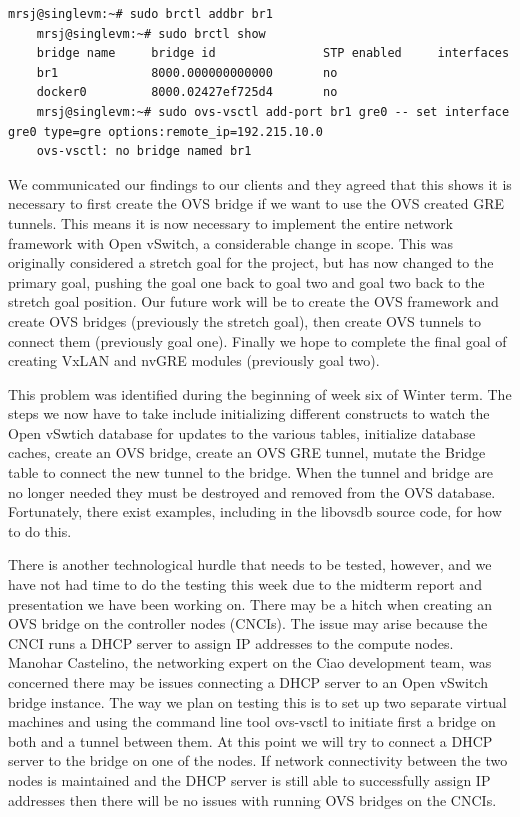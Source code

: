 \documentclass[10pt,onecolumn,journal,draftclsnofoot]{IEEEtran}
\begin{document}
\begin{lstlisting}[caption=No Linux Bridge and OVS Tunnel]
	mrsj@singlevm:~# sudo brctl addbr br1
	mrsj@singlevm:~# sudo brctl show
	bridge name     bridge id               STP enabled     interfaces
	br1             8000.000000000000       no
	docker0         8000.02427ef725d4       no
	mrsj@singlevm:~# sudo ovs-vsctl add-port br1 gre0 -- set interface gre0 type=gre options:remote_ip=192.215.10.0
	ovs-vsctl: no bridge named br1
\end{lstlisting}

We communicated our findings to our clients and they agreed that this shows it
is necessary to first create the OVS bridge if we want to use the OVS created
GRE tunnels. This means it is now necessary to implement the entire network
framework with Open vSwitch, a considerable change in scope. This was
originally considered a stretch goal for the project, but has now changed to
the primary goal, pushing the goal one back to goal two and goal two back to
the stretch goal position. Our future work will be to create the OVS framework
and create OVS bridges (previously the stretch goal), then create OVS tunnels
to connect them (previously goal one). Finally we hope to complete the final
goal of creating VxLAN and nvGRE modules (previously goal two).

This problem was identified during the beginning of week six of Winter term.
The steps we now have to take include initializing different constructs to
watch the Open vSwtich database for updates to the various tables, initialize
database caches, create an OVS bridge, create an OVS GRE tunnel, mutate the
Bridge table to connect the new tunnel to the bridge. When the tunnel and
bridge are no longer needed they must be destroyed and removed from the OVS
database. Fortunately, there exist examples, including in the libovsdb source
code, for how to do this.

There is another technological hurdle that needs to be tested, however, and we
have not had time to do the testing this week due to the midterm report and
presentation we have been working on. There may be a hitch when creating an OVS
bridge on the controller nodes (CNCIs). The issue may arise because the CNCI
runs a DHCP server to assign IP addresses to the compute nodes. Manohar
Castelino, the networking expert on the Ciao development team, was concerned
there may be issues connecting a DHCP server to an Open vSwitch bridge
instance. The way we plan on testing this is to set up two separate virtual
machines and using the command line tool ovs-vsctl to initiate first a bridge
on both and a tunnel between them. At this point we will try to connect a DHCP
server to the bridge on one of the nodes. If network connectivity between the
two nodes is maintained and the DHCP server is still able to successfully
assign IP addresses then there will be no issues with running OVS bridges on
the CNCIs.
\end{document}
